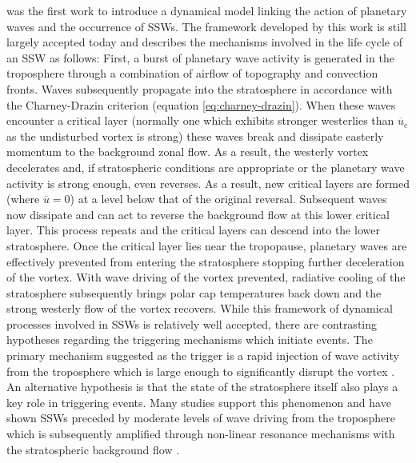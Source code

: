 {\cite{matsunoDynamical1971b} was the first work to introduce a dynamical model linking the action of planetary waves and the occurrence of SSWs. The framework developed by this work is still largely accepted today and describes the mechanisms involved in the life cycle of an SSW as follows: First, a burst of planetary wave activity is generated in the troposphere through a combination of airflow of topography and convection fronts. Waves subsequently propagate into the stratosphere in accordance with the Charney-Drazin criterion (equation \ref{eq:charney-drazin}). When these waves encounter a critical layer (normally one which exhibits stronger westerlies than $\overline{u}_c$ as the undisturbed vortex is strong) these waves break and dissipate easterly momentum to the background zonal flow. As a result, the westerly vortex decelerates and, if stratospheric conditions are appropriate or the planetary wave activity is strong enough, even reverses. As a result, new critical layers are formed (where $\overline{u} = 0$) at a level below that of the original reversal. Subsequent waves now dissipate and can act to reverse the background flow at this lower critical layer. This process repeats and the critical layers can descend into the lower stratosphere. Once the critical layer lies near the tropopause, planetary waves are effectively prevented from entering the stratosphere stopping further deceleration of the vortex. With wave driving of the vortex prevented, radiative cooling of the stratosphere subsequently brings polar cap temperatures back down and the strong westerly flow of the vortex recovers. While this framework of dynamical processes involved in SSWs is relatively well accepted, there are contrasting hypotheses regarding the triggering mechanisms which initiate events. The primary mechanism suggested as the trigger is a rapid injection of wave activity from the troposphere which is large enough to significantly disrupt the vortex \citep{matsunoDynamical1971b, limpasuvanLife2004b, manneyAura2009b, nishiiModulations2009b, kuttippurathComparative2012b}. An alternative hypothesis is that the state of the stratosphere itself also plays a key role in triggering events. Many studies support this phenomenon and have shown SSWs preceded by moderate levels of wave driving from the troposphere which is subsequently amplified through non-linear resonance mechanisms with the stratospheric background flow \citep{eslerExcitation2005b, scottInternal2006b, eslerStratospheric2011a}.

}
